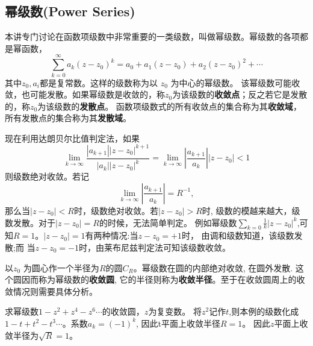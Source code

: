 \subsection{幂级数(Power Series)}
本讲专门讨论在函数项级数中非常重要的一类级数，叫做幂级数。幂级数的各项都是幂函数，
\begin{equation}
    \sum_{k=0}^{\infty} a_k\left(z-z_0\right)^k=a_0+a_1\left(z-z_0\right)+a_2\left(z-z_0\right)^2+\cdots
\end{equation}
其中$z_0, a_i$都是复常数。这样的级数称为以 $z_0$ 为中心的幂级数。
该幂级数可能收敛，也可能发散。如果幂级数是收敛的，称$z_0$为该级数的\textbf{收敛点}；反之若它是发散的，称$z_0$为该级数的\textbf{发散点}。
函数项级数式的所有收敛点的集合称为其\textbf{收敛域}，所有发散点的集合称为其\textbf{发散域}。

现在利用达朗贝尔比值判定法，如果
\begin{equation}
    \lim _{k \rightarrow \infty} \frac{\left|a_{k+1}\right|\left|z-z_0\right|^{k+1}}{\left|a_k\right|\left|z-z_0\right|^k}
    =\lim _{k \rightarrow \infty}\left|\frac{a_{k+1}}{a_k}\right|\left|z-z_0\right|<1
\end{equation}
则级数绝对收敛。若记
\begin{equation}
    \lim_{k \rightarrow \infty} \left|\frac{a_{k+1}}{a_k}\right| = R^{-1},
\end{equation}
那么当$|z-z_0| < R$时，级数绝对收敛。若$|z-z_0| > R$时, 级数的模越来越大，级数发散。对于$|z-z_0| = R$的时候，无法简单判定。
例如幂级数$\sum_{k=0} \frac{1}{k} |z-z_0|^k$,可知$R=1$。$|z-z_0|=1$有两种情况:当$z-z_0 = +1$时， 由调和级数知道，该级数发散;而
当$z-z_0 = -1$时，由莱布尼兹判定法可知该级数收敛。

以$z_0$ 为圆心作一个半径为$R$的圆$C_R$。幂级数在圆的内部绝对收敛, 在圆外发散. 这个圆因而称为幂级数的\textbf{收敛圆}, 
它的半径则称为\textbf{收敛半径}。至于在收敛圆周上的收敛情况则需要具体分析。

\begin{examplebox}{求幂级数$1 - z^2 + z^4 - z^6\cdots$的收敛圆，$z$为复变数。}
    将$z^2$记作$t$,则本例的级数化成$1-t + t^2 - t^3\cdots$。系数$a_k =(-1)^k$, 因此t平面上收敛半径$R=1$。 
    因此$z$平面上收敛半径为$\sqrt{R}=1$。
\end{examplebox}

